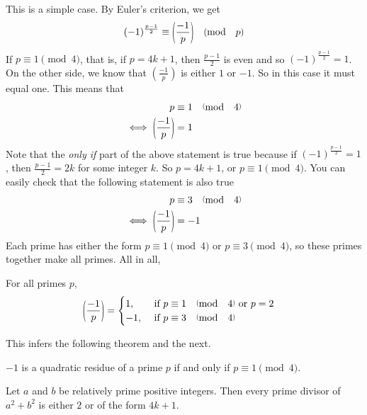 \documentclass[main.tex]{subfile}
\begin{document}
	\begin{solution}
		This is a simple case. By Euler's criterion, we get
		\begin{align*}
			(-1)^{\frac{p-1}{2}} \equiv \parenthesis{\dfrac{-1}{p}} \pmod p
		\end{align*}
		If $p \equiv 1 \pmod 4$, that is, if $p=4k+1$, then $\frac{p-1}{2}$ is even and so $(-1)^{\frac{p-1}{2}} =1$. On the other side, we know that $\left(\frac{-1}{p}\right)$ is either $1$ or $-1$. So in this case it must equal one. This means that
		\begin{align*}
			p
				& \equiv 1 \pmod 4\\
			\iff \parenthesis{\dfrac{-1}{p}}
				& =1
		\end{align*}
		Note that the \textit{only if} part of the above statement is true because if $(-1)^{\frac{p-1}{2}}=1$, then $\frac{p-1}{2} = 2k$ for some integer $k$. So $p=4k+1$, or $p \equiv 1 \pmod 4$. You can easily check that the following statement is also true
		\begin{align*}
			p
				& \equiv 3 \pmod 4\\
			\iff \parenthesis{\dfrac{-1}{p}}
				& =-1
		\end{align*}
		Each prime has either the form $p \equiv 1 \pmod 4$ or $p \equiv 3 \pmod 4$, so these primes together make all primes. All in all,
	\end{solution}

	\begin{theorem}\label{thm:-1qr} For all primes $p$,
		\begin{align*}
		\parenthesis{\dfrac{-1}{p}}
		& =
		\begin{cases}
		1,&\mbox{ if } p \equiv 1 \pmod 4\text{ or }p=2\\
		-1, &\mbox{ if } p \equiv 3 \pmod 4
		\end{cases}
		\end{align*}
	\end{theorem}
This infers the following theorem and the next.
	\begin{theorem}
		$-1$ is a quadratic residue of a prime $p$ if and only if $p\equiv1\pmod4$.
	\end{theorem}

	\begin{theorem} \label{thm:a^2+b^2}
		Let $a$ and $b$ be relatively prime positive integers. Then every prime divisor of $a^2+b^2$ is either $2$ or of the form $4k+1$.
	\end{theorem}
\end{document}
